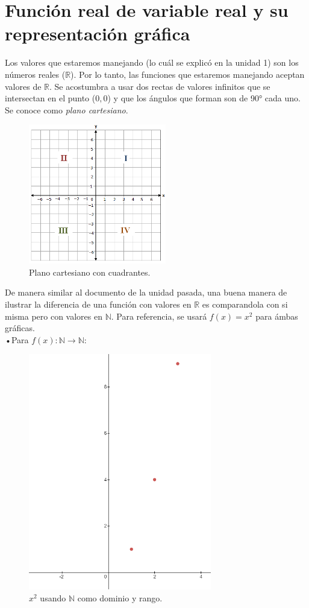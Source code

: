 \documentclass[letterpaper, 12pt]{article}
\begin{document}
        \section{Función real de variable real y su representación gráfica}
        Los valores que estaremos manejando (lo cuál se explicó en la unidad 1) son los números reales (\(\mathbb{R}\)). Por lo tanto, las funciones que estaremos manejando aceptan valores de \(\mathbb{R}\).
        Se acostumbra a usar dos rectas de valores infinitos que se intersectan en el punto (\(0,0\)) y que los ángulos que forman son de 90° cada uno. Se conoce como \emph{plano cartesiano}. 
        \begin{figure}[H]
            \centering
            \includegraphics[width=6cm]{plano.png}
            \caption{Plano cartesiano con cuadrantes.}
        \end{figure} 
        De manera similar al documento de la unidad pasada, una buena manera de ilustrar la diferencia de una función con valores en \(\mathbb{R}\) es comparandola con si misma pero con valores en \(\mathbb{N}\). Para referencia, se usará \(f(x)=x^2\) para ámbas gráficas.
        \\\newline
        •Para \(f(x):\mathbb{N}\rightarrow\mathbb{N}\):
        \begin{figure}[H]
            \centering
            \includegraphics[width=8cm]{fxn.PNG}
            \caption{\(x^2\) usando \(\mathbb{N}\) como dominio y rango.}
        \end{figure}  
\end{document}
